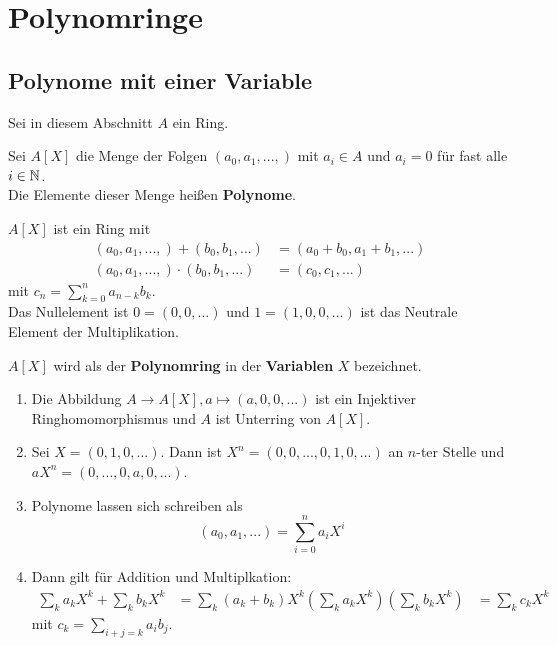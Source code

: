 \section{Polynomringe}
\subsection{Polynome mit einer Variable}
Sei in diesem Abschnitt $A$ ein Ring.

	\begin{definition}
		Sei $A[X]$ die Menge der Folgen $(a_0,a_1,...,)$ mit $a_i\in A$ und $a_i=0$ für fast alle $i\in\mathbb{N}$.\\
		Die Elemente dieser Menge heißen \textbf{Polynome}.
	\end{definition}
	
	\begin{definition}
		$A[X]$ ist ein Ring mit 
		\begin{align*}
		(a_0,a_1,...,)+(b_0,b_1,...)&=(a_0+b_0,a_1+b_1,...)\\
		(a_0,a_1,...,)\cdot(b_0,b_1,...)&=(c_0,c_1,...)
		\end{align*}
		mit $c_n=\sum_{k=0}^n a_{n-k}b_k$.\\
		Das Nullelement ist $0=(0,0,...)$ und $1=(1,0,0,...)$ ist das Neutrale Element der Multiplikation.\\
	\end{definition}

	\begin{definition}
		$A[X]$ wird als der \textbf{Polynomring} in der \textbf{Variablen} $X$ bezeichnet.\\
	\end{definition}

	\begin{prop}
		\begin{enumerate}
			\item Die Abbildung $A\to A[X],a\mapsto(a,0,0,...)$ ist ein Injektiver Ringhomomorphismus und $A$ ist Unterring von $A[X]$.
			\item Sei $X=(0,1,0,...)$. Dann ist $X^n=(0,0,...,0,1,0,...)$ an $n$-ter Stelle und $aX^n=(0,...,0,a,0,...)$. 
			\item Polynome lassen sich schreiben als
			\[(a_0,a_1,...)=\sum_{i=0}^na_iX^i\]
			\item Dann gilt für Addition und Multiplkation:
			\begin{align*}
			\sum_{k}a_kX^k+\sum_kb_kX^k&=\sum_k(a_k+b_k)X^k
			\left(\sum_{k}a_kX^k\right)\left(\sum_kb_kX^k\right)&=\sum_k c_kX^k
			\end{align*}
			mit $c_k=\sum_{i+j=k}a_ib_j$.
		\end{enumerate}
	\end{prop}

